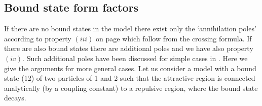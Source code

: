 \documentclass[a4paper,a4paper]{article}
\begin{document}
\subsection{Bound state form factors}

If there are no bound states in the model there exist only the `annihilation
poles' according to property $(iii)$ on page \pageref{p} which follow from
the crossing formula. If there are also bound states there are additional
poles \cite{KW} and we have also property $(iv)$. Such additional poles have
been discussed for simple cases in \cite{KW,BFKZ}. Here we give the
arguments for more general cases. Let us consider a model with a bound state
(12) of two particles of 1 and 2 such that the attractive region is
connected analytically (by a coupling constant) to a repulsive region, where
the bound state decays.
\end{document}
